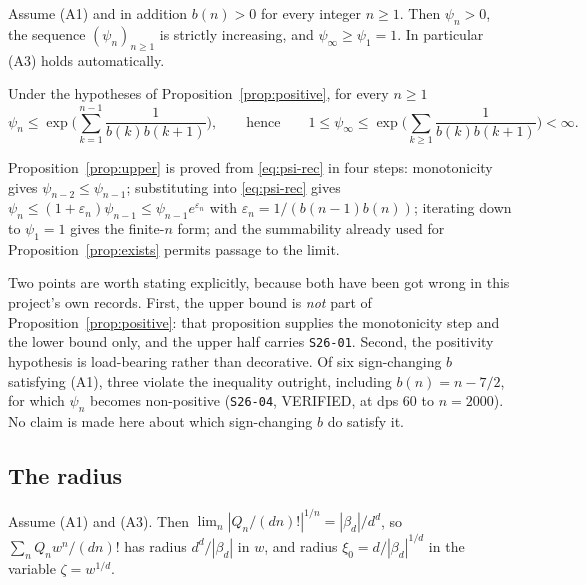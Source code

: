 \begin{proposition}\label{prop:positive}
Assume (A1) and in addition $b(n)>0$ for every integer $n\ge1$. Then $\psi_n>0$,
the sequence $(\psi_n)_{n\ge1}$ is strictly increasing, and
$\psi_\infty\ge\psi_1=1$. In particular (A3) holds automatically.
\end{proposition}

\begin{proposition}\label{prop:upper}
Under the hypotheses of Proposition~\ref{prop:positive}, for every $n\ge1$
\[
  \psi_n\le\exp\!\Big(\sum_{k=1}^{n-1}\frac{1}{b(k)b(k+1)}\Big),
  \qquad\text{hence}\qquad
  1\le\psi_\infty\le\exp\!\Big(\sum_{k\ge1}\frac{1}{b(k)b(k+1)}\Big)<\infty .
\]
\end{proposition}

Proposition~\ref{prop:upper} is proved from \eqref{eq:psi-rec} in four steps:
monotonicity gives $\psi_{n-2}\le\psi_{n-1}$; substituting into
\eqref{eq:psi-rec} gives $\psi_n\le(1+\varepsilon_n)\psi_{n-1}\le
\psi_{n-1}e^{\varepsilon_n}$ with $\varepsilon_n=1/(b(n-1)b(n))$; iterating down
to $\psi_1=1$ gives the finite-$n$ form; and the summability already used for
Proposition~\ref{prop:exists} permits passage to the limit.

Two points are worth stating explicitly, because both have been got wrong in
this project's own records. First, the upper bound is \emph{not} part of
Proposition~\ref{prop:positive}: that proposition supplies the monotonicity step
and the lower bound only, and the upper half carries \texttt{S26-01}. Second,
the positivity hypothesis is load-bearing rather than decorative. Of six
sign-changing $b$ satisfying (A1), three violate the inequality outright,
including $b(n)=n-7/2$, for which $\psi_n$ becomes non-positive
(\texttt{S26-04}, VERIFIED, at dps 60 to $n=2000$). No claim is made here about
which sign-changing $b$ do satisfy it.

\subsection{The radius}\label{ssec:radius}

\begin{theorem}\label{thm:radius}
Assume (A1) and (A3). Then $\lim_n|Q_n/(dn)!|^{1/n}=|\beta_d|/d^{d}$, so
$\sum_n Q_n w^{n}/(dn)!$ has radius $d^{d}/|\beta_d|$ in $w$, and radius
$\xi_0=d/|\beta_d|^{1/d}$ in the variable $\zeta=w^{1/d}$.
\end{theorem}

